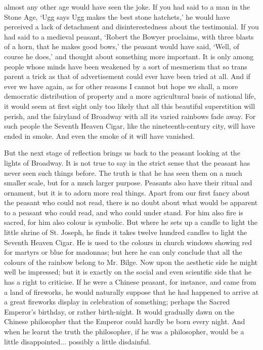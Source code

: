 \documentclass{book}
\begin{document}
almost any other age would have seen the joke. If you had said to a man in the Stone Age, ‘Ugg says Ugg makes the best stone hatchets,’ he would have perceived a lack of detachment and disinterestedness about the testimonial. If you had said to a medieval peasant, ‘Robert the Bowyer proclaims, with three blasts of a horn, that he makes good bows,’ the peasant would have said, ‘Well, of course he does,’ and thought about something more important. It is only among people whose minds have been weakened by a sort of mesmerism that so trans parent a trick as that of advertisement could ever have been tried at all. And if ever we have again, as for other reasons I cannot but hope we shall, a more democratic distribution of property and a more agricultural basis of national life, it would seem at first sight only too likely that all this beautiful superstition will perish, and the fairyland of Broadway with all its varied rainbows fade away. For such people the Seventh Heaven Cigar, like the nineteenth-century city, will have ended in smoke. And even the smoke of it will have vanished.

But the next stage of reflection brings us back to the peasant looking at the lights of Broadway. It is not true to say in the strict sense that the peasant has never seen such things before. The truth is that he has seen them on a much smaller scale, but for a much larger purpose. Peasants also have their ritual and ornament, but it is to adorn more real things. Apart from our first fancy about the peasant who could not read, there is no doubt about what would be apparent to a peasant who could read, and who could under stand. For him also fire is sacred, for him also colour is symbolic. But where he sets up a candle to light the little shrine of St. Joseph, he finds it takes twelve hundred candles to light the Seventh Heaven Cigar. He is used to the colours in church windows showing red for martyrs or blue for madonnas; but here he can only conclude that all the colours of the rainbow belong to Mr. Bilge. Now upon the aesthetic side he might well be impressed; but it is exactly on the social and even scientific side that he has a right to criticise. If he were a Chinese peasant, for instance, and came from a land of fireworks, he would naturally suppose that he had happened to arrive at a great fireworks display in celebration of something; perhaps the Sacred Emperor’s birthday, or rather birth-night. It would gradually dawn on the Chinese philosopher that the Emperor could hardly be born every night. And when he learnt the truth the philosopher, if he was a philosopher, would be a little disappointed... possibly a little disdainful.
\end{document}
